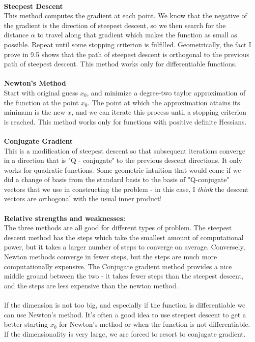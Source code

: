 \documentclass[12pt]{article}
\newenvironment{problem}[2][Problem]{\begin{trivlist}
\item[\hskip \labelsep {\bfseries #1}\hskip \labelsep {\bfseries #2.}]}{\end{trivlist}}
\theoremstyle{definition}
\theoremstyle{definition}
\theoremstyle{definition}
\theoremstyle{definition}
\begin{document}
\begin{problem}{9.3} \text{ }\\
\textbf{Steepest Descent} \\
This method computes the gradient at each point. We know that the negative of the gradient is the direction of steepest descent, so we then search for the distance $\alpha$ to travel along that gradient which makes the function as small as possible. Repeat until some stopping criterion is fulfilled. Geometrically, the fact I prove in 9.5 shows that the path of steepest descent is orthogonal to the previous path of steepest descent. This method works only for differentiable functions.  \\
\\
\textbf{Newton's Method} \\
Start with original guess $x_0$, and minimize a degree-two taylor approximation of the function at the point $x_0$. The point at which the approximation attains its minimum is the new $x$, and we can iterate this process until a stopping criterion is reached. This method works only for functions with positive definite Hessians. \\ 
\\
\textbf{Conjugate Gradient} \\
This is a modification of steepest descent so that subsequent iterations converge in a direction that is "Q - conjugate" to the previous descent directions. It only works for quadratic functions. Some geometric intuition that would come if we did a change of basis from the standard basis to the basis of "Q-conjugate" vectors that we use in constructing the problem - in this case, I \textit{think} the descent vectors are orthogonal with the usual inner product! \\
\\
\textbf{Relative strengths and weaknesses:} \\
The three methods are all good for different types of problem. The steepest descent method has the steps which take the smallest amount of computational power, but it takes a larger number of steps to converge on average. Conversely, Newton methods converge in fewer steps, but the steps are much more computationally expensive. The Conjugate gradient method provides a nice middle ground between the two - it takes fewer steps than the steepest descent, and the steps are less expensive than the newton method.\\
\\
If the dimension is not too big, and especially if the function is differentiable we can use Newton's method. It's often a good idea to use steepest descent to get a better starting $x_0$ for Newton's method or when the function is not differentiable. If the dimensionality is very large, we are forced to resort to conjugate gradient.
\end{problem}
\end{document}
